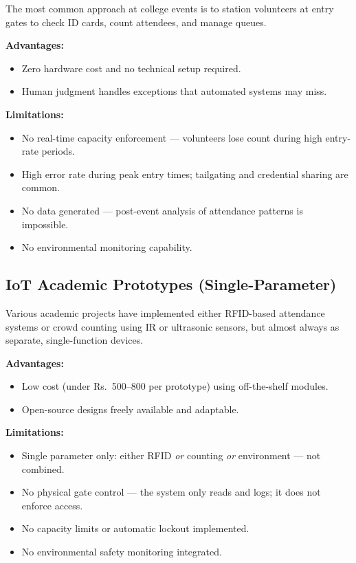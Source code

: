 \documentclass[12pt,a4paper]{report}
\begin{document}
The most common approach at college events is to station volunteers at entry gates to check ID cards, count attendees, and manage queues.

\textbf{Advantages:}
\begin{itemize}[leftmargin=*]
    \item Zero hardware cost and no technical setup required.
    \item Human judgment handles exceptions that automated systems may miss.
\end{itemize}

\textbf{Limitations:}
\begin{itemize}[leftmargin=*]
    \item No real-time capacity enforcement --- volunteers lose count during high entry-rate periods.
    \item High error rate during peak entry times; tailgating and credential sharing are common.
    \item No data generated --- post-event analysis of attendance patterns is impossible.
    \item No environmental monitoring capability.
\end{itemize}

\subsection{IoT Academic Prototypes (Single-Parameter)}

Various academic projects have implemented either RFID-based attendance systems or crowd counting using IR or ultrasonic sensors, but almost always as separate, single-function devices.

\textbf{Advantages:}
\begin{itemize}[leftmargin=*]
    \item Low cost (under Rs.~500--800 per prototype) using off-the-shelf modules.
    \item Open-source designs freely available and adaptable.
\end{itemize}

\textbf{Limitations:}
\begin{itemize}[leftmargin=*]
    \item Single parameter only: either RFID \textit{or} counting \textit{or} environment --- not combined.
    \item No physical gate control --- the system only reads and logs; it does not enforce access.
    \item No capacity limits or automatic lockout implemented.
    \item No environmental safety monitoring integrated.
\end{itemize}
\end{document}
